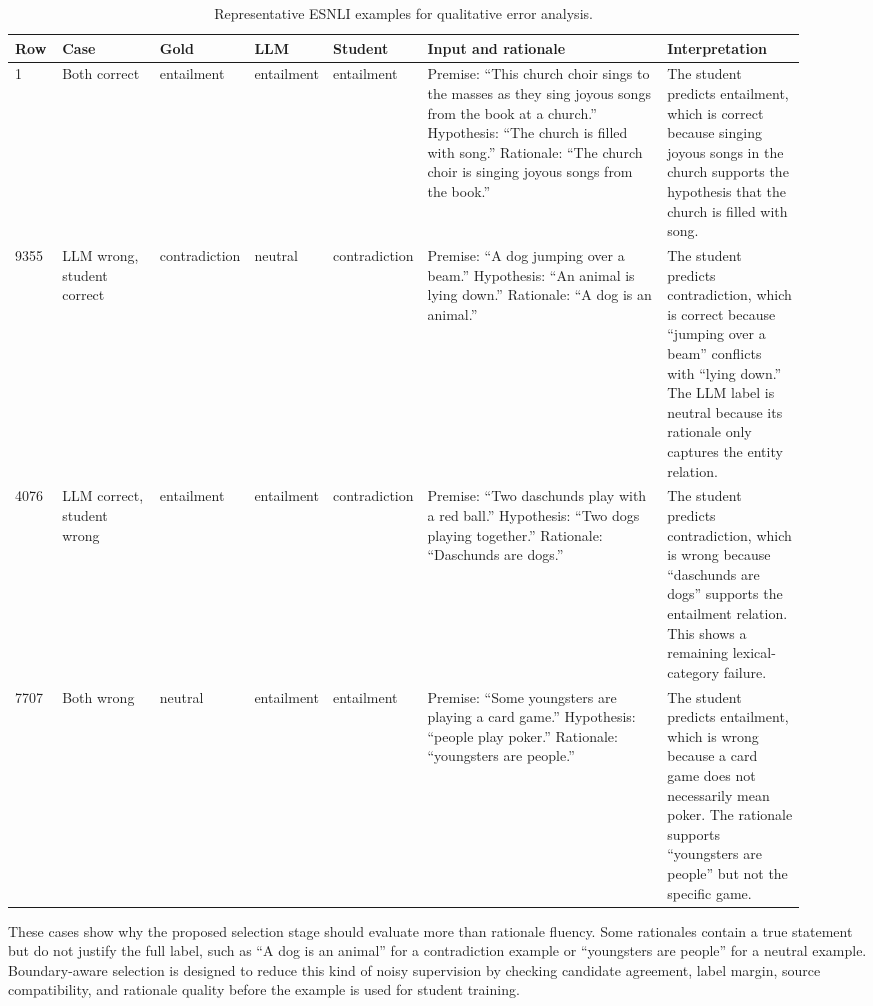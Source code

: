 \begin{table}[H]
\centering
\caption{Representative ESNLI examples for qualitative error analysis.}
\label{tab:qualitative-examples}
\begin{tabular}{p{0.06\linewidth} p{0.13\linewidth} p{0.075\linewidth} p{0.075\linewidth} p{0.075\linewidth} p{0.33\linewidth} p{0.18\linewidth}}
\hline
Row & Case & Gold & LLM & Student & Input and rationale & Interpretation \\
\hline
1 &
Both correct &
entailment &
entailment &
entailment &
Premise: ``This church choir sings to the masses as they sing joyous songs from the book at a church.'' Hypothesis: ``The church is filled with song.'' Rationale: ``The church choir is singing joyous songs from the book.'' &
The student predicts entailment, which is correct because singing joyous songs in the church supports the hypothesis that the church is filled with song. \\
\hline
9355 &
LLM wrong, student correct &
contradiction &
neutral &
contradiction &
Premise: ``A dog jumping over a beam.'' Hypothesis: ``An animal is lying down.'' Rationale: ``A dog is an animal.'' &
The student predicts contradiction, which is correct because ``jumping over a beam'' conflicts with ``lying down.'' The LLM label is neutral because its rationale only captures the entity relation. \\
\hline
4076 &
LLM correct, student wrong &
entailment &
entailment &
contradiction &
Premise: ``Two daschunds play with a red ball.'' Hypothesis: ``Two dogs playing together.'' Rationale: ``Daschunds are dogs.'' &
The student predicts contradiction, which is wrong because ``daschunds are dogs'' supports the entailment relation. This shows a remaining lexical-category failure. \\
\hline
7707 &
Both wrong &
neutral &
entailment &
entailment &
Premise: ``Some youngsters are playing a card game.'' Hypothesis: ``people play poker.'' Rationale: ``youngsters are people.'' &
The student predicts entailment, which is wrong because a card game does not necessarily mean poker. The rationale supports ``youngsters are people'' but not the specific game. \\
\hline
\end{tabular}
\end{table}

These cases show why the proposed selection stage should evaluate more than rationale fluency. Some rationales contain a true statement but do not justify the full label, such as ``A dog is an animal'' for a contradiction example or ``youngsters are people'' for a neutral example. Boundary-aware selection is designed to reduce this kind of noisy supervision by checking candidate agreement, label margin, source compatibility, and rationale quality before the example is used for student training.
